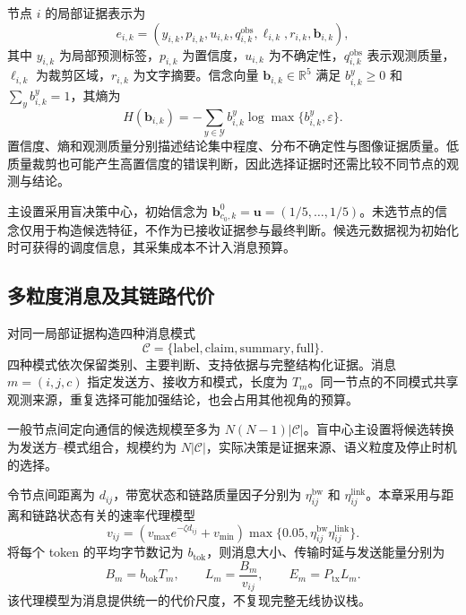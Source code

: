 节点 $i$ 的局部证据表示为
\begin{equation}
e_{i,k}=\left(y_{i,k},p_{i,k},u_{i,k},q_{i,k}^{\mathrm{obs}},\ell_{i,k},r_{i,k},\bm b_{i,k}\right),
\label{rq2:eq:evidence}
\end{equation}
其中 $y_{i,k}$ 为局部预测标签，$p_{i,k}$ 为置信度，$u_{i,k}$ 为不确定性，$q_{i,k}^{\mathrm{obs}}$ 表示观测质量，$\ell_{i,k}$ 为裁剪区域，$r_{i,k}$ 为文字摘要。信念向量 $\bm b_{i,k}\in\mathbb R^5$ 满足 $b_{i,k}^{y}\geq0$ 和 $\sum_y b_{i,k}^{y}=1$，其熵为
\begin{equation}
H(\bm b_{i,k})=-\sum_{y\in\mathcal Y}b_{i,k}^{y}\log\max\{b_{i,k}^{y},\varepsilon\}.
\label{rq2:eq:entropy}
\end{equation}
置信度、熵和观测质量分别描述结论集中程度、分布不确定性与图像证据质量。低质量裁剪也可能产生高置信度的错误判断，因此选择证据时还需比较不同节点的观测与结论。

主设置采用盲决策中心，初始信念为 $\bm b_{c_0,k}^{0}=\bm u=(1/5,\ldots,1/5)$。未选节点的信念仅用于构造候选特征，不作为已接收证据参与最终判断。候选元数据视为初始化时可获得的调度信息，其采集成本不计入消息预算。

\subsection{多粒度消息及其链路代价}
对同一局部证据构造四种消息模式
\begin{equation}
\mathcal C=\{\mathrm{label},\mathrm{claim},\mathrm{summary},\mathrm{full}\}.
\label{rq2:eq:modes}
\end{equation}
四种模式依次保留类别、主要判断、支持依据与完整结构化证据。消息 $m=(i,j,c)$ 指定发送方、接收方和模式，长度为 $T_m$。同一节点的不同模式共享观测来源，重复选择可能加强结论，也会占用其他视角的预算。

一般节点间定向通信的候选规模至多为 $N(N-1)|\mathcal C|$。盲中心主设置将候选转换为发送方--模式组合，规模约为 $N|\mathcal C|$，实际决策是证据来源、语义粒度及停止时机的选择。

令节点间距离为 $d_{ij}$，带宽状态和链路质量因子分别为 $\eta_{ij}^{\mathrm{bw}}$ 和 $\eta_{ij}^{\mathrm{link}}$。本章采用与距离和链路状态有关的速率代理模型
\begin{equation}
v_{ij}=\left(v_{\max}e^{-\zeta d_{ij}}+v_{\min}\right)
\max\{0.05,\eta_{ij}^{\mathrm{bw}}\eta_{ij}^{\mathrm{link}}\}.
\label{rq2:eq:rate}
\end{equation}
将每个 token 的平均字节数记为 $b_{\mathrm{tok}}$，则消息大小、传输时延与发送能量分别为
\begin{equation}
B_m=b_{\mathrm{tok}}T_m,\qquad
L_m=\frac{B_m}{v_{ij}},\qquad E_m=P_{\mathrm{tx}}L_m.
\label{rq2:eq:cost}
\end{equation}
该代理模型为消息提供统一的代价尺度，不复现完整无线协议栈。

